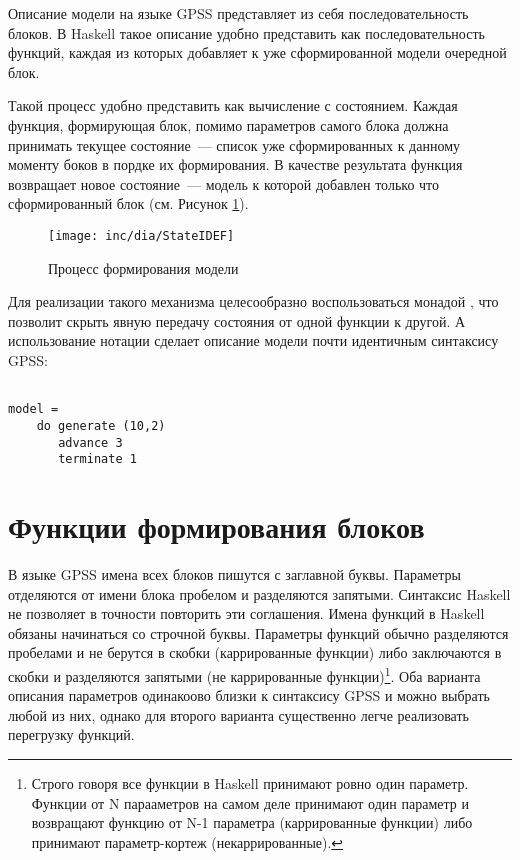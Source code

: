 Описание модели на языке GPSS представляет из себя последовательность блоков. В Haskell такое описание удобно представить как последовательность функций, каждая из которых добавляет к уже сформированной модели очередной блок. 

Такой процесс удобно представить как вычисление с состоянием. Каждая функция, формирующая блок, помимо параметров самого блока должна принимать текущее состояние~--- список уже сформированных к данному моменту боков в пордке их формирования. В качестве результата функция возвращает новое состояние~--- модель к которой добавлен только что сформированный блок (см. Рисунок \ref{fig:StateIDEF}).

\begin{figure}[ht]
  \centering
  \texttt{[image: inc/dia/StateIDEF]}
  \caption{Процесс формирования модели}
  \label{fig:StateIDEF}
\end{figure}

Для реализации такого механизма целесообразно воспользоваться монадой , что позволит скрыть явную передачу состояния от одной функции к другой. А использование нотации  сделает описание модели почти идентичным синтаксису GPSS:

\begin{verbatim}

model = 
    do generate (10,2)
       advance 3
       terminate 1

\end{verbatim}


\section{Функции формирования блоков}

В языке GPSS имена всех блоков пишутся с заглавной буквы. Параметры отделяются от имени блока пробелом и разделяются запятыми. Синтаксис Haskell не позволяет в точности повторить эти соглашения. Имена функций в Haskell обязаны начинаться со строчной буквы. Параметры функций обычно разделяются пробелами и не берутся в скобки (каррированные функции) либо заключаются в скобки и разделяются запятыми (не каррированные функции)\footnote{Строго говоря все функции в Haskell принимают ровно один параметр. Функции от N парааметров на самом деле принимают один параметр и возвращают функцию от N-1 параметра (каррированные функции) либо принимают параметр-кортеж (некаррированные).}. Оба варианта описания параметров одинакоово близки к синтаксису GPSS и можно выбрать любой из них, однако для второго варианта существенно легче реализовать перегрузку функций.

